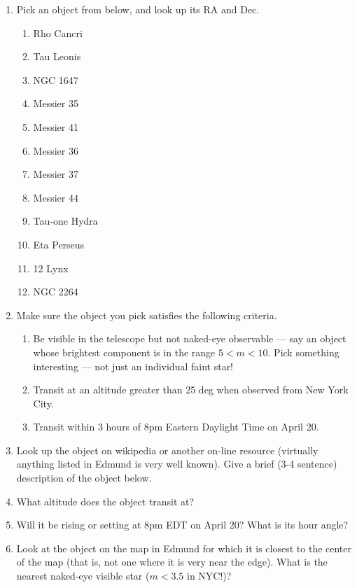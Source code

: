 \documentclass[11pt, preprint]{aastex}
\begin{document}
\begin{enumerate}
\item Pick an object from below, and look up its RA and Dec.  
\begin{enumerate}
\item Rho Cancri
\item Tau Leonis
\item NGC 1647
\item Messier 35
\item Messier 41
\item Messier 36
\item Messier 37
\item Messier 44
\item Tau-one Hydra
\item Eta Perseus
\item 12 Lynx
\item NGC 2264
\end{enumerate}
\item Make sure the object you pick satisfies the following criteria.
\begin{enumerate}
\item Be visible in the telescope but not naked-eye observable --- say
an object whose brightest component is in the range $5<m<10$. Pick
something interesting --- not just an individual faint star!
\item Transit at an altitude greater than 25 deg when observed from New York City.
\item Transit within 3 hours of 8pm Eastern Daylight Time on April 20. 
\end{enumerate}
\vspace{80pt}
\item Look up the object on wikipedia or another on-line resource
(virtually anything listed in Edmund is very well known). Give a brief
(3-4 sentence) description of the object below.
\vspace{80pt}
\item What altitude does the object transit at?
\vspace{40pt}
\item Will it be rising or setting at 8pm EDT on April 20?  What is its
hour angle?
\vspace{40pt}
\item Look at the object on the map in Edmund for which it is closest
to the center of the map (that is, not one where it is very near the
edge). What is the nearest naked-eye visible star ($m<3.5$ in NYC!)?
\vspace{40pt}

\end{enumerate}
\end{document}

